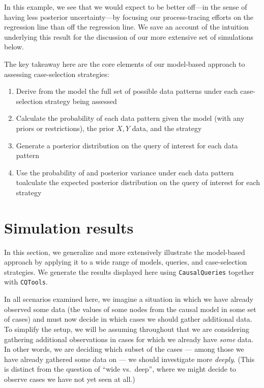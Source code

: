 \documentclass[
  12pt,
]{book}
\providecommand{\tightlist}{%
  \setlength{\itemsep}{0pt}\setlength{\parskip}{0pt}}
\begin{document}
In this example, we see that we would expect to be better off---in the sense of having less posterior uncertainty---by focusing our process-tracing efforts on the regression line than off the regression line. We save an account of the intuition underlying this result for the discussion of our more extensive set of simulations below.

The key takeaway here are the core elements of our model-based approach to assessing case-selection strategies:

\begin{enumerate}
\def\labelenumi{\arabic{enumi}.}
\tightlist
\item
  Derive from the model the full set of possible data patterns under each case-selection strategy being assessed
\item
  Calculate the probability of each data pattern given the model (with any priors or restrictions), the prior \(X,Y\) data, and the strategy
\item
  Generate a posterior distribution on the query of interest for each data pattern
\item
  Use the probability of and posterior variance under each data pattern toalculate the expected posterior distribution on the query of interest for each strategy
\end{enumerate}

\hypertarget{simulation-results}{%
\section{Simulation results}\label{simulation-results}}

In this section, we generalize and more extensively illustrate the model-based approach by applying it to a wide range of models, queries, and case-selection strategies. We generate the results displayed here using \texttt{CausalQueries} together with \texttt{CQTools}.

In all scenarios examined here, we imagine a situation in which we have already observed some data (the values of some nodes from the causal model in some set of cases) and must now decide in which cases we should gather additional data. To simplify the setup, we will be assuming throughout that we are considering gathering additional observations in cases for which we already have \emph{some} data. In other words, we are deciding which subset of the cases --- among those we have already gathered some data on --- we should investigate more \emph{deeply}. (This is distinct from the question of ``wide vs.~deep'', where we might decide to observe cases we have not yet seen at all.)
\end{document}
